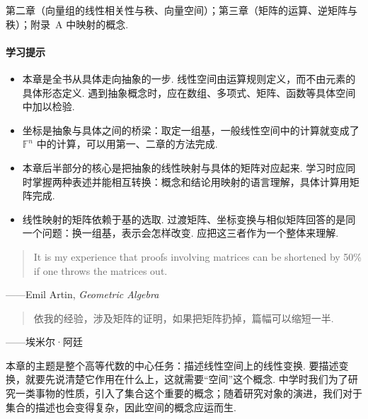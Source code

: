 \documentclass[lang=cn,10.5pt,scheme=chinese,toc=twocol,section,chinesefont=nofont,
twoside,citestyle=gb7714-2015,bibstyle=gb7714-2015]{elegantbook}
\numberwithin{equation}{section}   %
\begin{document}
第二章（向量组的线性相关性与秩、向量空间）；第三章（矩阵的运算、逆矩阵与秩）；附录~A 中映射的概念.

\paragraph*{学习提示}
\begin{itemize}
  \item 本章是全书从具体走向抽象的一步. 线性空间由运算规则定义，而不由元素的具体形态定义. 遇到抽象概念时，应在数组、多项式、矩阵、函数等具体空间中加以检验.
  \item 坐标是抽象与具体之间的桥梁：取定一组基，一般线性空间中的计算就变成了 $\mathbb{F}^n$ 中的计算，可以用第一、二章的方法完成.
  \item 本章后半部分的核心是把抽象的线性映射与具体的矩阵对应起来. 学习时应同时掌握两种表述并能相互转换：概念和结论用映射的语言理解，具体计算用矩阵完成.
  \item 线性映射的矩阵依赖于基的选取. 过渡矩阵、坐标变换与相似矩阵回答的是同一个问题：换一组基，表示会怎样改变. 应把这三者作为一个整体来理解.
\end{itemize}

\newpage
\begin{tcolorbox}[epigraph, epigraph image*={0.25\linewidth}{image/artin.jpg}{埃米尔·阿廷}{fig:artin}]
  \begin{quote}
    It is my experience that proofs involving matrices can be shortened by 50\% if one throws the matrices out.
  \end{quote}
  \begin{flushright}
    ——Emil Artin, \textit{Geometric Algebra}
  \end{flushright}
  \begin{quote}
    依我的经验，涉及矩阵的证明，如果把矩阵扔掉，篇幅可以缩短一半.
  \end{quote}
  \begin{flushright}
    ——埃米尔·阿廷\footnotemark
  \end{flushright}
\end{tcolorbox}

本章的主题是整个高等代数的中心任务：描述线性空间上的线性变换. 要描述变换，就要先说清楚它作用在什么上，这就需要“空间”这个概念. 中学时我们为了研究一类事物的性质，引入了集合这个重要的概念；随着研究对象的演进，我们对于集合的描述也会变得复杂，因此空间的概念应运而生.
\end{document}
